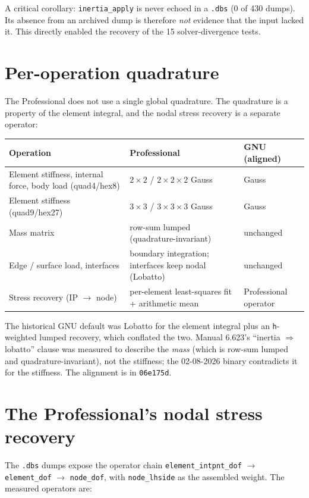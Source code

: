 \documentclass[11pt,a4paper]{report}
\newcommand{\code}[1]{\texttt{#1}}
\begin{document}
A critical corollary: \code{inertia\_\allowbreak apply} is never echoed in a \code{.dbs} (0 of
430 dumps). Its absence from an archived dump is therefore \emph{not} evidence
that the input lacked it. This directly enabled the recovery of the 15
solver-divergence tests.

\section{Per-operation quadrature}
\label{sec:quadrature}

The Professional does not use a single global quadrature. The quadrature is a
property of the element integral, and the nodal stress recovery is a separate
operator:

\begin{center}
\begin{tabular}{@{}L{6.2cm}L{4.4cm}L{4.0cm}@{}}
\toprule
Operation & Professional & GNU (aligned) \\
\midrule
Element stiffness, internal force, body load (quad4/hex8) & $2\times2$ / $2\times2\times2$ Gauss & Gauss \\
Element stiffness (quad9/hex27) & $3\times3$ / $3\times3\times3$ Gauss & Gauss \\
Mass matrix & row-sum lumped (quadrature-invariant) & unchanged \\
Edge / surface load, interfaces & boundary integration; interfaces keep nodal (Lobatto) & unchanged \\
Stress recovery (IP $\rightarrow$ node) & per-element least-squares fit + arithmetic mean & Professional operator \\
\bottomrule
\end{tabular}
\end{center}

The historical GNU default was Lobatto for the element integral plus an
\code{h}-weighted lumped recovery, which conflated the two. Manual 6.623's
``inertia $\Rightarrow$ lobatto'' clause was measured to describe the
\emph{mass} (which is row-sum lumped and quadrature-invariant), not the
stiffness; the 02-08-2026 binary contradicts it for the stiffness. The alignment
is in \code{06e175d}.

\section{The Professional's nodal stress recovery}
\label{sec:stress-recovery}

The \code{.dbs} dumps expose the operator chain
\code{element\_\allowbreak intpnt\_\allowbreak dof} $\rightarrow$ \code{element\_\allowbreak dof} $\rightarrow$
\code{node\_\allowbreak dof}, with \code{node\_\allowbreak lhside} as the assembled weight. The measured
operators are:
\end{document}
